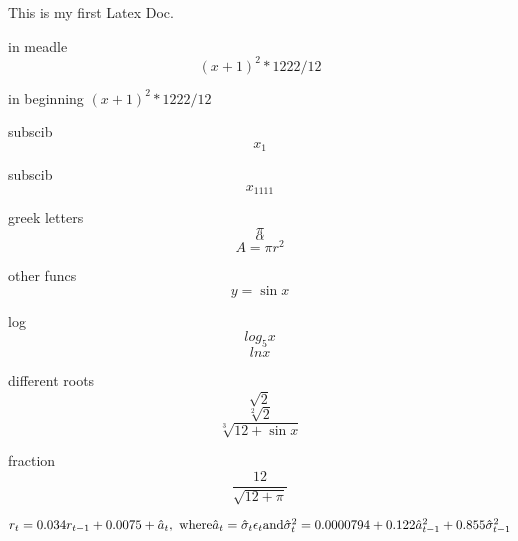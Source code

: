 \documentclass[11pt]{article}
\begin{document}
	This is my first Latex Doc.
	
	in meadle $$(x+1)^2*1222/12$$
	
	in beginning $(x+1)^2*1222/12$
	
	subscib $$x_1$$
	
	subscib $$x_{1111}$$
	
	greek letters
	$$\pi$$
	$$\alpha$$
	$$A=\pi r^2$$
	
	other funcs
	$$y=\sin{x}$$
	
	log
	$$log_5{x}$$
	$$ln{x}$$
	
	different roots
	$$\sqrt{2}$$
	$$\sqrt[2]{2}$$
	$$\sqrt[3]{12+\sin{x}}$$
	
	fraction
	$$\frac{12}{\sqrt{12+\pi}}$$
	
	
		$r_t = 0.034 r_{t-1} + 0.0075 + \hat{a}_t, \text{ where} \\ 
		\hat{a}_t = \hat{\sigma}_t \epsilon_t \text{and} \\ 
		\hat{\sigma}_t^2 = 0.0000794 + 0.122 \hat{a}_{t-1}^2 + 0.855 \hat{\sigma}_{t-1}^2$
\end{document}
